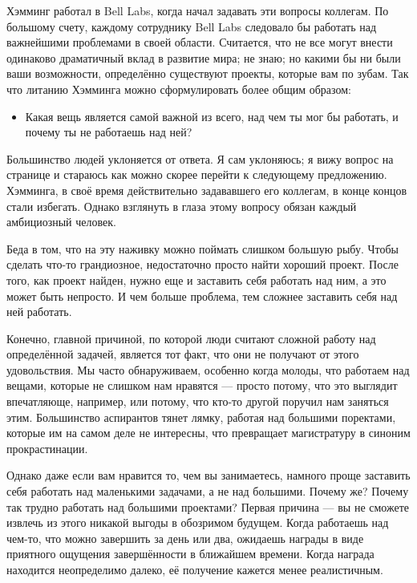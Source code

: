 \documentclass[ebook,12pt,oneside,openany]{memoir}
\begin{document}
Хэмминг работал в Bell Labs, когда начал задавать эти вопросы
коллегам. По большому счету, каждому сотруднику Bell Labs следовало бы
работать над важнейшими проблемами в своей области. Считается, что не
все могут внести одинаково драматичный вклад в развитие мира; не знаю;
но какими бы ни были ваши возможности, определённо существуют проекты,
которые вам по зубам. Так что литанию Хэмминга можно сформулировать
более общим образом: \newline

\begin{itemize}
\item{Какая вещь является самой важной из всего, над чем ты мог бы работать,
и почему ты не работаешь над ней?}
\end{itemize}

Большинство людей уклоняется от ответа. Я сам уклоняюсь; я вижу вопрос
на странице и стараюсь как можно скорее перейти к следующему
предложению. Хэмминга, в своё время действительно задававшего его
коллегам, в конце концов стали избегать. Однако взглянуть в глаза
этому вопросу обязан каждый амбициозный человек. \newline

Беда в том, что на эту наживку можно поймать слишком большую рыбу.
Чтобы сделать что-то грандиозное, недостаточно просто найти хороший
проект. После того, как проект найден, нужно еще и заставить себя
работать над ним, а это может быть непросто. И чем больше проблема,
тем сложнее заставить себя над ней работать. \newline

Конечно, главной причиной, по которой люди считают сложной работу над
определённой задачей, является тот факт, что они не получают от этого
удовольствия. Мы часто обнаруживаем, особенно когда молоды, что
работаем над вещами, которые не слишком нам нравятся — просто потому,
что это выглядит впечатляюще, например, или потому, что кто-то другой
поручил нам заняться этим. Большинство аспирантов тянет лямку, работая
над большими поректами, которые им на самом деле не интересны, что
превращает магистратуру в синоним прокрастинации. \newline

Однако даже если вам нравится то, чем вы занимаетесь, намного проще
заставить себя работать над маленькими задачами, а не над большими.
Почему же? Почему так трудно работать над большими проектами? Первая
причина — вы не сможете извлечь из этого никакой выгоды в обозримом
будущем. Когда работаешь над чем-то, что можно завершить за день или
два, ожидаешь награды в виде приятного ощущения завершённости в
ближайшем времени. Когда награда находится неопределимо далеко, её
получение кажется менее реалистичным. \newline
\end{document}

